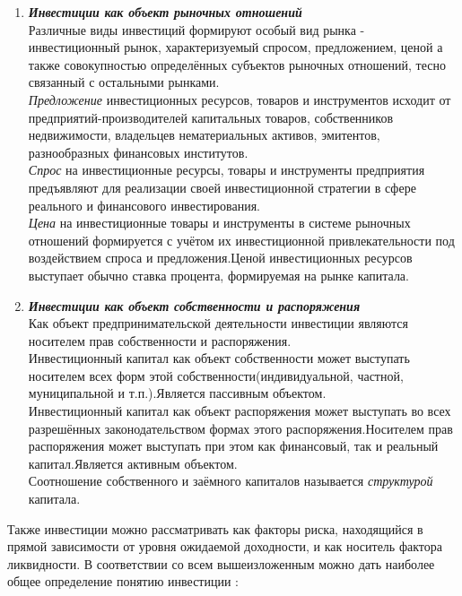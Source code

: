 \documentclass[a4paper,12pt]{article}
\begin{document}
\begin{flushleft}
\begin{enumerate}
				\item \textbf{\textit{Инвестиции как объект рыночных отношений}}\\ \medskip			 
			Различные виды инвестиций формируют особый вид рынка - инвестиционный рынок, характеризуемый спросом, предложением, ценой а также совокупностью определённых субъектов рыночных отношений, тесно связанный с остальными рынками.\\
			\textit{Предложение} инвестиционных ресурсов, товаров и инструментов исходит от предприятий-производителей капитальных товаров, собственников недвижимости, владельцев нематериальных активов, эмитентов, разнообразных финансовых институтов.\\
			\textit{Спрос} на инвестиционные ресурсы, товары и инструменты предприятия предъявляют для реализации своей инвестиционной стратегии в сфере реального и финансового инвестирования.\\
			\textit{Цена} на инвестиционные товары и инструменты в системе рыночных отношений формируется с учётом их инвестиционной привлекательности под воздействием спроса и предложения.Ценой инвестиционных ресурсов выступает обычно ставка процента, формируемая на рынке капитала.  
				\item \textbf{\textit{Инвестиции как объект собственности и распоряжения}}\\ \medskip
			Как объект предпринимательской деятельности инвестиции являются носителем прав собственности и распоряжения.\\
			Инвестиционный капитал как объект собственности может выступать носителем всех форм этой собственности(индивидуальной, частной, муниципальной и т.п.).Является пассивным объектом.\\
			Инвестиционный капитал как объект распоряжения может выступать во всех разрешённых законодательством формах этого распоряжения.Носителем прав распоряжения может выступать при этом как финансовый, так и реальный капитал.Является активным объектом.\\   				   
			Соотношение собственного и заёмного капиталов называется \textit{структурой} капитала.\\ \medskip
			\end{enumerate}
\end{flushleft}			 
			Также инвестиции можно рассматривать как факторы риска, находящийся в прямой зависимости от уровня ожидаемой доходности, и как носитель фактора ликвидности.
			\newpage
			В соответствии со всем вышеизложенным можно дать наиболее общее определение понятию инвестиции :\\ 
			
\end{document}

